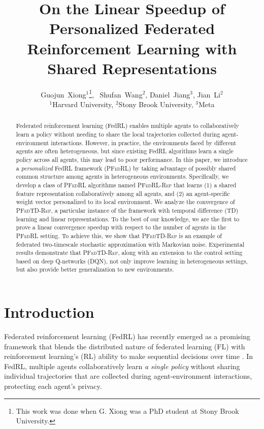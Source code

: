 \documentclass{article} %
\title{On the Linear Speedup of Personalized Federated Reinforcement Learning with Shared Representations}
\author{Guojun~Xiong$^1$\thanks{This work was done when G. Xiong was a PhD student at Stony Brook University.}, ~Shufan~Wang$^2$, Daniel~Jiang$^3$, Jian~Li$^2$ \\
  ${}^1$Harvard University, ${}^2$Stony Brook University, ${}^3$Meta
  }
\theoremstyle{plain}
\theoremstyle{definition}
\theoremstyle{remark}
\newcommand{\PFRL}{\textsc{PFedRL}\xspace}
\newcommand{\FedRL}{\textsc{PFedRL-Rep}\xspace}
\newcommand{\FedTD}{\textsc{PFedTD-Rep}\xspace}
\begin{document}
\maketitle

\begin{abstract}

Federated reinforcement learning (FedRL) enables multiple agents to collaboratively learn a policy without needing to share the local trajectories collected during agent-environment interactions.
However, in practice, the environments faced by different agents are often heterogeneous, but since existing FedRL algorithms learn a single policy across all agents, this may lead to poor performance. In this paper, we introduce a \emph{personalized} FedRL framework (\PFRL) by taking advantage of possibly shared common structure among agents in heterogeneous environments. Specifically, we develop a class of \PFRL algorithms named \FedRL that learns (1) a shared feature representation collaboratively among all agents, and (2) an agent-specific weight vector personalized to its local environment. We analyze the convergence of \FedTD, a particular instance of the framework with temporal difference (TD) learning and linear representations. To the best of our knowledge, we are the first to prove a linear convergence speedup with respect to the number of agents in the \PFRL setting. To achieve this, we show that \FedTD is an example of federated two-timescale stochastic approximation with Markovian noise.  Experimental results demonstrate that \FedTD, along with an extension to the control setting based on deep Q-networks (DQN), not only improve learning in heterogeneous settings, but also provide better generalization to new environments.

\end{abstract}




 \section{Introduction}\label{intro}

Federated reinforcement learning (FedRL) \citep{nadiger2019federated,liu2019lifelong,xu2021multiagent,zhang2022multi,jin2022federated,khodadadian2022federated,yuan2023federated,salgia2024sample,woo2024federated,zhengfederated,lan2024asynchronous} has recently emerged as a promising framework that blends the distributed nature of federated learning (FL) \citep{mcmahan2017communication} with reinforcement learning's (RL) ability to make sequential decisions over time \citep{sutton2018reinforcement}. In FedRL, multiple agents collaboratively learn \textit{a single policy} without sharing individual trajectories that are collected during agent-environment interactions, protecting each agent's privacy.
\end{document}
